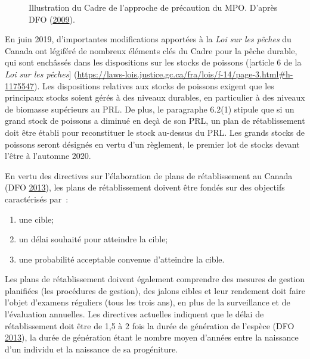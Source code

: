 \documentclass[11pt]{book}
\begin{document}
\begin{figure}[htb]

{\centering {} 

}

\caption{Illustration du Cadre de l'approche de précaution du MPO. D'après DFO (\protect\hyperlink{ref-dfo2009}{2009}).}\label{fig:pa-illustration}
\end{figure}
En juin 2019, d'importantes modifications apportées à la \emph{Loi sur les pêches} du Canada ont légiféré de nombreux éléments clés du Cadre pour la pêche durable, qui sont enchâssés dans les dispositions sur les stocks de poissons ({[}article 6 de la \emph{Loi sur les pêches}{]} (\url{https://laws-lois.justice.gc.ca/fra/lois/f-14/page-3.html\#h-1175547}). Les dispositions relatives aux stocks de poissons exigent que les principaux stocks soient gérés à des niveaux durables, en particulier à des niveaux de biomasse supérieurs au PRL. De plus, le paragraphe 6.2(1) stipule que si un grand stock de poissons a diminué en deçà de son PRL, un plan de rétablissement doit être établi pour reconstituer le stock au-dessus du PRL. Les grands stocks de poissons seront désignés en vertu d'un règlement, le premier lot de stocks devant l'être à l'automne 2020.

En vertu des directives sur l'élaboration de plans de rétablissement au Canada (DFO \protect\hyperlink{ref-dfo2013}{2013}), les plans de rétablissement doivent être fondés sur des objectifs caractérisés par~:
\begin{enumerate}
\def\labelenumi{\arabic{enumi}.}

\item
  une cible;
\item
  un délai souhaité pour atteindre la cible;
\item
  une probabilité acceptable convenue d'atteindre la cible.
\end{enumerate}
Les plans de rétablissement doivent également comprendre des mesures de gestion planifiées (les procédures de gestion), des jalons cibles et leur rendement doit faire l'objet d'examens réguliers (tous les trois ans), en plus de la surveillance et de l'évaluation annuelles. Les directives actuelles indiquent que le délai de rétablissement doit être de 1,5 à 2 fois la durée de génération de l'espèce (DFO \protect\hyperlink{ref-dfo2013}{2013}), la durée de génération étant le nombre moyen d'années entre la naissance d'un individu et la naissance de sa progéniture.
\end{document}
